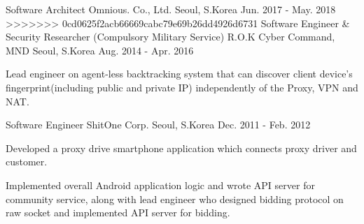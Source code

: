 \begin{cventries}
  \cventry
    {Software Architect} %
    {Omnious. Co., Ltd.} %
    {Seoul, S.Korea} %
    {Jun. 2017 - May. 2018} %
>>>>>>> 0cd0625f2acb66669cabc79e69b26dd4926d6731
 \cventry
    {Software Engineer \& Security Researcher (Compulsory Military Service)} %
    {R.O.K Cyber Command, MND} %
    {Seoul, S.Korea} %
    {Aug. 2014 - Apr. 2016} %
    {
      \begin{cvitems} %
        \item {Lead engineer on agent-less backtracking system that can discover client device's fingerprint(including public and private IP) independently of the Proxy, VPN and NAT.}
      \end{cvitems}
    }

  \cventry
    {Software Engineer} %
    {ShitOne Corp.} %
    {Seoul, S.Korea} %
    {Dec. 2011 - Feb. 2012} %
    {
      \begin{cvitems} %
        \item {Developed a proxy drive smartphone application which connects proxy driver and customer.}
        \item {Implemented overall Android application logic and wrote API server for community service, along with lead engineer who designed bidding protocol on raw socket and implemented API server for bidding.}
      \end{cvitems}
    }

\end{cventries}

